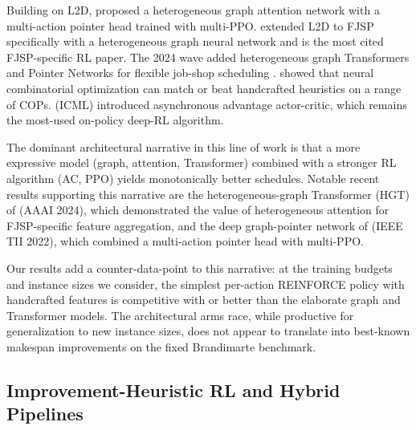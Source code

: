 \documentclass[10pt]{article}
\theoremstyle{definition}
\begin{document}
Building on L2D, \citet{Lei2022} proposed a heterogeneous
graph attention network with a multi-action pointer head
trained with multi-PPO. \citet{Song2022TII} extended L2D
to FJSP specifically with a heterogeneous graph neural
network and is the most cited FJSP-specific RL paper.
The 2024 wave added heterogeneous graph Transformers
\citep{Yang2024, Kool2019} and Pointer Networks for
flexible job-shop scheduling \citep{Vinyals2015}.
\citet{Bello2017NCO} showed that neural combinatorial
optimization can match or beat handcrafted heuristics
on a range of COPs. \citet{Mnih2016A3C} (ICML)
introduced asynchronous advantage actor-critic, which
remains the most-used on-policy deep-RL algorithm.

The dominant architectural narrative in this line of work is
that a more expressive model (graph, attention, Transformer)
combined with a stronger RL algorithm (AC, PPO) yields
monotonically better schedules. Notable recent results supporting
this narrative are the heterogeneous-graph Transformer
(HGT) of \citet{Yang2024} (AAAI 2024), which
demonstrated the value of heterogeneous attention for
FJSP-specific feature aggregation, and the deep
graph-pointer network of \citet{Lei2022} (IEEE TII
2022), which combined a multi-action pointer head with
multi-PPO.

Our results add a counter-data-point to this narrative: at the
training budgets and instance sizes we consider, the simplest
per-action REINFORCE policy with handcrafted features is
competitive with or better than the elaborate graph and
Transformer models. The architectural arms race, while
productive for generalization to new instance sizes, does not
appear to translate into best-known makespan improvements on the
fixed Brandimarte benchmark.

\subsection{Improvement-Heuristic RL and Hybrid Pipelines}
\label{sec:rw-improvement}
\end{document}
